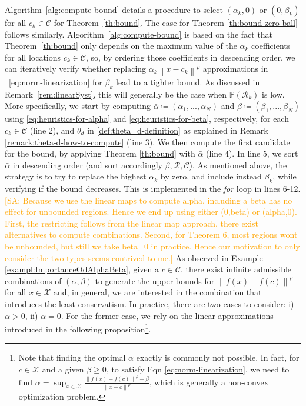 \documentclass[11pt, a4paper, oneside,reqno]{amsart}
\theoremstyle{plain}
\def\prob{\mathbb{P}}
\newcommand{\norm}[1]{\left\lVert#1\right\rVert}
\def\sR{{\mathcal{R}}}
\def\sX{{\mathcal{X}}}
\def\bsR{{\bm{\mathcal{R}}}}
\def\bsC{{\bm{\mathcal{C}}}}
\newcommand{\SA}[1]{\textcolor{orange}{[SA: #1]}}
\begin{document}
Algorithm~\ref{alg:compute-bound} details a procedure to select $(\alpha_k,0)$ or $(0,\beta_k)$ for all $c_k \in \bsC$ for Theorem~\ref{th:bound}. The case for Theorem \ref{th:bound-zero-ball} follows similarly. Algorithm~\ref{alg:compute-bound} is based on the fact that Theorem~\ref{th:bound} only depends on the maximum value of the $\alpha_k$ coefficients for all locations $c_k \in \bsC$, so, by ordering those coefficients in descending order, we can iteratively verify whether replacing $\alpha_k\norm{x-c_k}^\rho$ approximations in ~\eqref{eq:norm-linearization} for $\beta_k$ lead to a tighter bound. As discussed in Remark~\ref{rem:linearSyst}, this will generally be the case when $\prob(\sR_k)$ is low.   
More specifically, we start by computing $\bar\alpha \coloneqq (\alpha_1,...,\alpha_N)$ and $\bar\beta \coloneqq (\beta_1,...,\beta_N)$ using \eqref{eq:heuristics-for-alpha} and \eqref{eq:heuristics-for-beta}, respectively, for each $c_k \in \bsC$ (line 2), and $\theta_d$ in \eqref{def:theta_d-definition} as explained in Remark \ref{remark:theta-d-how-to-compute} (line 3). We then compute the first candidate for the bound, by applying Theorem \ref{th:bound} with $\bar\alpha$ (line 4). In line 5, we sort $\bar\alpha$ in descending order (and sort accordingly $\bar\beta, \bsR, \bsC$). As mentioned above, the strategy is to try to replace the highest $\alpha_k$ by zero, and include instead $\beta_k$, while verifying if the bound decreases. This is implemented in the \emph{for} loop in lines 6-12. %
\iffalse
    \SA{Because we use the linear maps to compute alpha, including a beta has no effect for unbounded regions. Hence we end up using either (0,beta) or (alpha,0). First, the restricting follows from the linear map approach, there exist alternatives to compute combinations. Second, for Theorem 6, most regions wont be unbounded, but still we take beta=0 in practice. Hence our motivation to only consider the two types seems contrived to me.}
    As observed in Example \ref{exampl:ImportanceOdAlphaBeta}, given a $c \in \bsC$, there exist infinite admissible combinations of $(\alpha, \beta)$ to generate the upper-bounds for $\norm{f(x)-f(c)}^\rho$ for all $x \in \sX$ and, in general, we are interested in the combination that introduces the least conservatism. In practice, there are two cases to consider: i) $\alpha>0$, ii) $\alpha=0$. For the former case, we rely on the linear approximations introduced in the following proposition\footnote{Note that finding the optimal $\alpha$ exactly is commonly not possible. In fact, for $c \in \sX$ and a given $\beta \geq 0$, to satisfy Eqn \eqref{eq:norm-linearization}, we need to find  $\alpha = \sup_{x\in \sX} \frac{\norm{f(x)-f(c)}^\rho - \beta}{\norm{x-c}^\rho}$, which is generally a non-convex optimization problem.}.
\end{document}
